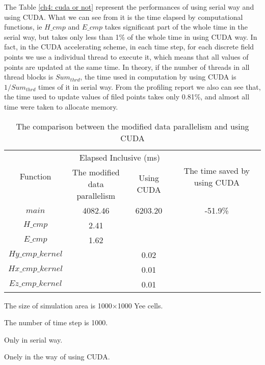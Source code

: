The Table \ref{ch4: cuda or not} represent the performances of using serial way and using CUDA. What we can see from it is the time elapsed by computational functions, ie $H\_cmp$ and $E\_cmp$ takes significant part of the whole time in the serial way, but takes only less than 1\% of the whole time in using CUDA way. In fact, in the CUDA accelerating scheme, in each time step, for each discrete field points we use a individual thread to execute it, which means that all values of points are updated at the same time. In theory, if the number of threads in all thread blocks is $Sum_{thrd}$, the time used in computation by using CUDA is $1/Sum_{thrd}$ times of it in serial way. From the profiling report we also can see that, the time used to update values of filed points takes only 0.81\%, and almost all time were taken to allocate memory.

\begin{table}[hp]
	\centering
	\caption{The comparison between the modified data parallelism and using CUDA}\label{ch4: cuda or new}
\begin{threeparttable}
	\begin{tabular}{cccc}
		\toprule
		\multirow{2}{2em}{Function}&\multicolumn{2}{c}{Elapsed Inclusive (ms)} & \multirow{2}{14em}{The time saved by using CUDA}\\ 
		\cline{2-3}
		& \makecell{The modified\\data parallelism} & Using CUDA & \\ 
		
		\midrule
			$main$ & 4082.46 & 6203.20 & -51.9\% \\
			$H\_cmp$\tnote{3} & 2.41 &  & \\ 
			$E\_cmp$\tnote{3} & 1.62 &  & \\
			$Hy\_cmp\_kernel$\tnote{4} &  & 0.02 & \\ 
			$Hx\_cmp\_kernel$\tnote{4} &  & 0.01 & \\ 
			$Ez\_cmp\_kernel$\tnote{4} &  & 0.01 & \\
		\bottomrule
	\end{tabular}
	\begin{tablenotes}
		\item[1] The size of simulation area is 1000$\times$1000 Yee cells.
		\item[2] The number of time step is 1000.
		\item[3] Only in serial way.
		\item[4] Onely in the way of using CUDA.
	\end{tablenotes}
\end{threeparttable}
\end{table}


